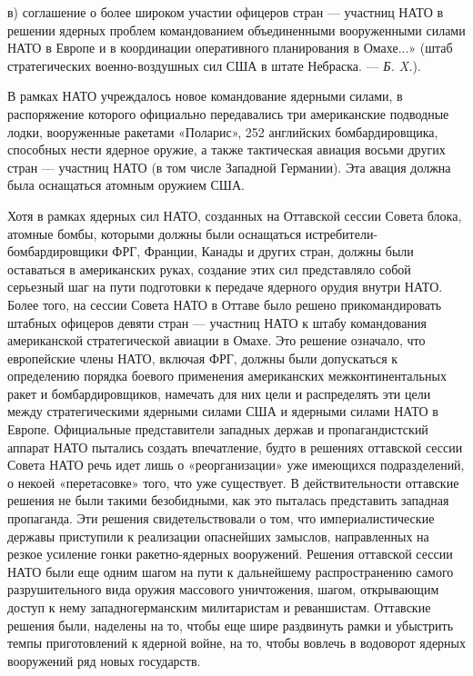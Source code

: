 \documentclass[12pt, a4paper, openany]{book}
\begin{document}
в) соглашение о более широком участии офицеров стран — участниц НАТО в решении ядерных проблем командованием объединенными вооруженными силами НАТО в Европе и в координации оперативного планирования в Омахе...» (штаб стратегических военно-воздушных сил США в штате Небраска. — \textit{Б. X.}).

В рамках НАТО учреждалось новое командование ядерными силами, в распоряжение которого официально передавались три американские подводные лодки, вооруженные ракетами «Поларис», 252 английских бомбардировщика, способных нести ядерное оружие, а также тактическая авиация восьми других стран — участниц НАТО (в том числе Западной Германии). Эта авация должна была оснащаться атомным оружием США.

Хотя в рамках ядерных сил НАТО, созданных на Оттавской сессии Совета блока, атомные бомбы, которыми должны были оснащаться истребители-бомбардировщики ФРГ, Франции, Канады и других стран, должны были оставаться в американских руках, создание этих сил представляло собой серьезный шаг на пути подготовки к передаче ядерного орудия внутри НАТО. Более того, на сессии Совета НАТО в Оттаве было решено прикомандировать штабных офицеров девяти стран — участниц НАТО к штабу командования американской стратегической авиации в Омахе. Это решение означало, что европейские члены НАТО, включая ФРГ, должны были допускаться к определению порядка боевого применения американских межконтинентальных ракет и бомбардировщиков, намечать для них цели и распределять эти цели между стратегическими ядерными силами США и ядерными силами НАТО в Европе. Официальные представители западных держав и пропагандистский аппарат НАТО пытались создать впечатление, будто в решениях оттавской сессии Совета НАТО речь идет лишь о «реорганизации» уже имеющихся подразделений, о некоей «перетасовке» того, что уже существует. В действительности оттавские решения не были такими безобидными, как это пыталась представить западная пропаганда. Эти решения свидетельствовали о том, что империалистические державы приступили к реализации опаснейших замыслов, направленных на резкое усиление гонки ракетно-ядерных вооружений. Решения оттавской сессии НАТО были еще одним шагом на пути к дальнейшему распространению самого разрушительного вида оружия массового уничтожения, шагом, открывающим доступ к нему западногерманским милитаристам и реваншистам. Оттавские решения были, наделены на то, чтобы еще шире раздвинуть рамки и убыстрить темпы приготовлений к ядерной войне, на то, чтобы вовлечь в водоворот ядерных вооружений ряд новых государств.
\end{document}

